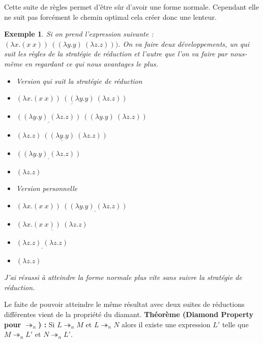 \documentclass[10pt,a4paper]{report}
\newtheorem{ex}{Exemple}
\begin{document}
	Cette suite de règles permet d'être sûr d'avoir une forme normale. Cependant elle ne suit pas forcément le chemin optimal cela créer donc une lenteur. 
	\medbreak
	
	
	
	\begin{ex}
		Si on prend l'expression suivante : $(\lambda x.(x~x))~((\lambda y.y)~(\lambda z.z)))$. On va faire deux développements, un qui suit les règles de la stratégie de réduction et l'autre que l'on va faire par nous-même en regardant ce qui nous avantages le plus.
		\begin{multicols}{2}{
				\begin{itemize}
					\item[] Version qui suit la stratégie de réduction
					\item[] $\underline{(\lambda x.(x~x))~((\lambda y.y)~(\lambda z.z))}$
					\item[$\rightarrow_{n}^{\beta}$] $\underline{((\lambda y.y)~(\lambda z.z))}~((\lambda y.y)~(\lambda z.z))$
					\item[$\rightarrow_{n}^{\beta}$] $\underline{(\lambda z.z)~((\lambda y.y)~(\lambda z.z))}$
					\item[$\rightarrow_{n}^{\beta}$] $\underline{((\lambda y.y)~(\lambda z.z))}$
					\item[$\rightarrow_{n}^{\beta}$] $(\lambda z.z)$
				\end{itemize}
				
				\begin{itemize}
					\item[] Version personnelle
					\item[] $(\lambda x.(x~x))~\underline{((\lambda y.y)~(\lambda z.z))}$
					\item[$\rightarrow_{n}^{\beta}$] $\underline{(\lambda x.(x~x))~(\lambda z.z)}$
					\item[$\rightarrow_{n}^{\beta}$] $\underline{(\lambda z.z)~(\lambda z.z)}$
					\item[$\rightarrow_{n}^{\beta}$] $(\lambda z.z)$
				\end{itemize}
			}
		\end{multicols}
		\smallbreak 
		J'ai résussi à atteindre la forme normale plus vite sans suivre la stratégie de réduction.
	\end{ex} 
	\medbreak
	
	Le faite de pouvoir atteindre le même résultat avec deux suites de réductions différentes vient de la propriété du diamant.
	\smallbreak
	\textbf{Théorème (Diamond Property pour $\twoheadrightarrow_{n}$) :} Si $L \twoheadrightarrow_{n} M$ et $L \twoheadrightarrow_{n} N$ alors il existe une expression $L'$ telle que $M \twoheadrightarrow_{n} L'$ et $N \twoheadrightarrow_{n} L'$.
	
\end{document}

